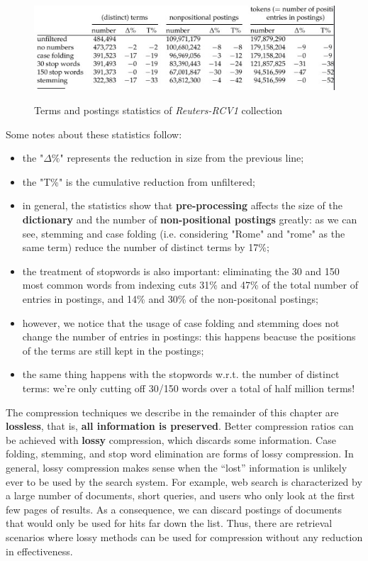 \begin{figure}[h!]
		\centering
		\includegraphics[scale = 1.7]{img/statistics.jpg}
		\label{statistics}
        \caption{Terms and postings statistics of \textit{Reuters-RCV1} collection}
\end{figure}

Some notes about these statistics follow:

\begin{itemize}
    \item the "$\Delta \%$" represents the reduction in size from the previous line;
    \item the "T\%" is the cumulative reduction from unfiltered;
    \item in general, the statistics show that \textbf{pre-processing} affects the size of the \textbf{dictionary} and the number of \textbf{non-positional postings} greatly: as we can see, stemming and case folding (i.e. considering "Rome" and "rome" as the same term) reduce the number of distinct terms by 17\%;
    \item the treatment of stopwords is also important: eliminating the 30 and 150 most common words from indexing cuts 31\% and 47\% of the total number of entries in postings, and 14\% and 30\% of the non-positonal postings;
    \item however, we notice that the usage of case folding and stemming does not change the number of entries in postings: this happens beacuse the positions of the terms are still kept in the postings;
    \item the same thing happens with the stopwords w.r.t. the number of distinct terms: we're only cutting off 30/150 words over a total of half million terms!
\end{itemize}

The compression techniques we describe in the remainder of this chapter are \textbf{lossless}, that is, \textbf{all information is preserved}. Better compression ratios can be achieved with \textbf{lossy} compression, which discards some information. Case folding, stemming, and stop word elimination are forms of lossy compression. In general, lossy compression makes sense when the “lost” information is unlikely ever to be used by the search system. For example, web search is characterized by a large number of documents, short queries, and users who only look at the first few pages of results. As a consequence, we can discard postings of documents that would only be used for hits far down the list. Thus, there are retrieval scenarios where lossy methods can be used for compression without any reduction in effectiveness.

